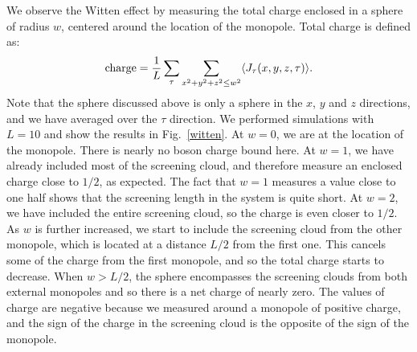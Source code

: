 \documentclass[prb,twocolumn]{revtex4-1}
\newcommand{\scripty}[1]{w}
\begin{document}
We observe the Witten effect by measuring the total charge enclosed in a sphere of radius $\scripty{r}$, centered around the location of the monopole. Total charge is defined as:
\begin{equation}
{\rm charge}=\frac{1}{L}\sum_\tau \sum_{x^2+y^2+z^2\leq w^2} \langle J_\tau(x,y,z,\tau) \rangle.
\end{equation}
Note that the sphere discussed above is only a sphere in the $x$, $y$ and $z$ directions, and we have averaged over the $\tau$ direction.
We performed simulations with $L=10$ and show the results in Fig.~\ref{witten}.
At $\scripty{r}=0$, we are at the location of the monopole. There is nearly no boson charge bound here. At $\scripty{r}=1$, we have already included most of the screening cloud, and therefore measure an enclosed charge close to $1/2$, as expected. The fact that $\scripty{r}=1$ measures a value close to one half shows that the screening length in the system is quite short. At $\scripty{r}=2$, we have included the entire screening cloud, so the charge is even closer to $1/2$. As $\scripty{r}$ is further increased, we start to include the screening cloud from the other monopole, which is located at a distance $L/2$ from the first one. This cancels some of the charge from the first monopole, and so the total charge starts to decrease. When $\scripty{r}>L/2$, the sphere encompasses the screening clouds from both external monopoles and so there is a net charge of nearly zero. The values of charge are negative because we measured around a monopole of positive charge, and the sign of the charge in the screening cloud is the opposite of the sign of the monopole. 
\end{document}
